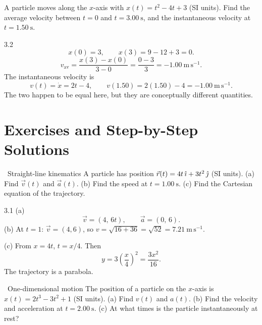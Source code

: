 \begin{worked}
A particle moves along the $x$-axis with $x(t)=t^2-4t+3$ (SI units). Find the
average velocity between $t=0$ and $t=3.00\ \mathrm{s}$, and the instantaneous
velocity at $t=1.50\ \mathrm{s}$.
\end{worked}

\begin{solution}{3.2}
\[
x(0)=3,\qquad x(3)=9-12+3=0.
\]
\[
v_{\mathrm{av}}=\frac{x(3)-x(0)}{3-0}=\frac{0-3}{3}=-1.00\ \mathrm{m\,s^{-1}}.
\]
The instantaneous velocity is
\[
v(t)=\dot x=2t-4,
\qquad
v(1.50)=2(1.50)-4=-1.00\ \mathrm{m\,s^{-1}}.
\]
The two happen to be equal here, but they are conceptually different quantities.
\end{solution}

\section{Exercises and Step-by-Step Solutions}

\begin{exercise}{\warm\ Straight-line kinematics}
A particle has position $\vec r(t)=4t\,\hat{\imath}+3t^2\,\hat{\jmath}$ (SI units).
(a) Find $\vec v(t)$ and $\vec a(t)$.
(b) Find the speed at $t=1.00\ \mathrm{s}$.
(c) Find the Cartesian equation of the trajectory.
\end{exercise}

\begin{tabletworkspace}[6.5cm]
\end{tabletworkspace}

\begin{solution}{3.1}
(a)
\[
\vec v=(4,\,6t),\qquad \vec a=(0,\,6).
\]
(b) At $t=1$: $\vec v=(4,6)$, so
$v=\sqrt{16+36}=\sqrt{52}=7.21\ \mathrm{m\,s^{-1}}$.

(c) From $x=4t$, $t=x/4$. Then
\[
y=3\left(\frac x4\right)^2=\frac{3x^2}{16}.
\]
The trajectory is a parabola.
\end{solution}

\begin{exercise}{\warm\ One-dimensional motion}
The position of a particle on the $x$-axis is $x(t)=2t^3-3t^2+1$ (SI units).
(a) Find $v(t)$ and $a(t)$.
(b) Find the velocity and acceleration at $t=2.00\ \mathrm{s}$.
(c) At what times is the particle instantaneously at rest?
\end{exercise}

\begin{tabletworkspace}[6.5cm]
\end{tabletworkspace}


